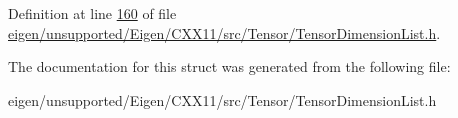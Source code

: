 Definition at line \hyperlink{eigen_2unsupported_2_eigen_2_c_x_x11_2src_2_tensor_2_tensor_dimension_list_8h_source_l00160}{160} of file \hyperlink{eigen_2unsupported_2_eigen_2_c_x_x11_2src_2_tensor_2_tensor_dimension_list_8h_source}{eigen/unsupported/\+Eigen/\+C\+X\+X11/src/\+Tensor/\+Tensor\+Dimension\+List.\+h}.



The documentation for this struct was generated from the following file\+:\begin{DoxyCompactItemize}
\item 
eigen/unsupported/\+Eigen/\+C\+X\+X11/src/\+Tensor/\+Tensor\+Dimension\+List.\+h\end{DoxyCompactItemize}
